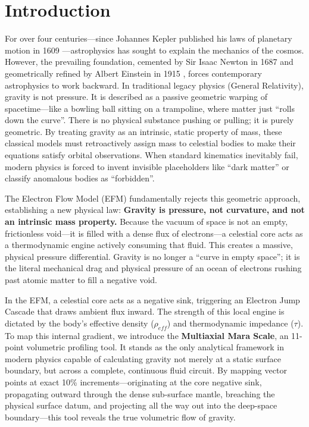 \documentclass[11pt, a4paper]{article}
\begin{document}
\section{Introduction}
  For over four centuries---since Johannes Kepler published his laws of planetary motion in 1609 \cite{kepler1609}---astrophysics has sought to explain the mechanics of the cosmos. However, the prevailing foundation, cemented by Sir Isaac Newton in 1687 \cite{newton1687} and geometrically refined by Albert Einstein in 1915 \cite{einstein1915}, forces contemporary astrophysics to work backward. In traditional legacy physics (General Relativity), gravity is not pressure. It is described as a passive geometric warping of spacetime---like a bowling ball sitting on a trampoline, where matter just ``rolls down the curve''. There is no physical substance pushing or pulling; it is purely geometric. By treating gravity as an intrinsic, static property of mass, these classical models must retroactively assign mass to celestial bodies to make their equations satisfy orbital observations. When standard kinematics inevitably fail, modern physics is forced to invent invisible placeholders like ``dark matter'' or classify anomalous bodies as ``forbidden''.

  The Electron Flow Model (EFM) fundamentally rejects this geometric approach, establishing a new physical law: \textbf{Gravity is pressure, not curvature, and not an intrinsic mass property.} Because the vacuum of space is not an empty, frictionless void---it is filled with a dense flux of electrons---a celestial core acts as a thermodynamic engine actively consuming that fluid. This creates a massive, physical pressure differential. Gravity is no longer a ``curve in empty space''; it is the literal mechanical drag and physical pressure of an ocean of electrons rushing past atomic matter to fill a negative void.

  In the EFM, a celestial core acts as a negative sink, triggering an Electron Jump Cascade that draws ambient flux inward. The strength of this local engine is dictated by the body's effective density ($\rho_{eff}$) and thermodynamic impedance ($\tau$). To map this internal gradient, we introduce the \textbf{Multiaxial Mara Scale}, an 11-point volumetric profiling tool. It stands as the only analytical framework in modern physics capable of calculating gravity not merely at a static surface boundary, but across a complete, continuous fluid circuit. By mapping vector points at exact 10\% increments---originating at the core negative sink, propagating outward through the dense sub-surface mantle, breaching the physical surface datum, and projecting all the way out into the deep-space boundary---this tool reveals the true volumetric flow of gravity.
\end{document}
